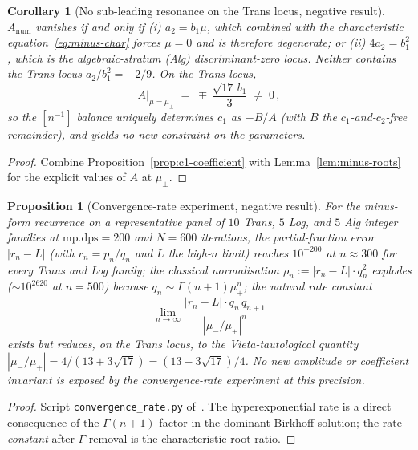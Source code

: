 \documentclass[11pt]{amsart}
\newtheorem{proposition}[theorem]{Proposition}
\newtheorem{corollary}[theorem]{Corollary}
\theoremstyle{definition}
\theoremstyle{remark}
\begin{document}
\begin{corollary}[No sub-leading resonance on the Trans locus,
negative result]
\label{cor:no-resonance}
$A_{\text{num}}$ vanishes if and only if (i) $a_2 = b_1\mu$, which
combined with the characteristic equation~\eqref{eq:minus-char}
forces $\mu = 0$ and is therefore degenerate; or (ii)
$4 a_2 = b_1^2$, which is the algebraic-stratum (Alg)
discriminant-zero locus.  Neither contains the Trans locus
$a_2/b_1^2 = -2/9$.  On the Trans locus,
\[
  A\bigl|_{\mu = \mu_\pm}
  \;=\; \mp\,\frac{\sqrt{17}\,b_1}{3}
  \;\neq\;0\,,
\]
so the $[n^{-1}]$ balance uniquely determines $c_1$ as $-B/A$
(with $B$ the $c_1$-and-$c_2$-free remainder), and yields no new
constraint on the parameters.
\end{corollary}
\begin{proof}
Combine Proposition~\ref{prop:c1-coefficient} with
Lemma~\ref{lem:minus-roots} for the explicit values of $A$ at
$\mu_\pm$.
\end{proof}

\begin{proposition}[Convergence-rate experiment, negative result]
\label{prop:rate}
For the minus-form recurrence on a representative panel of $10$
Trans, $5$ Log, and $5$ Alg integer families at $\mathrm{mp.dps}=200$
and $N=600$ iterations, the partial-fraction error
$|r_n - L|$ (with $r_n = p_n/q_n$ and $L$ the high-$n$ limit) reaches
$10^{-200}$ at $n\approx 300$ for every Trans and Log family;
the classical normalisation $\rho_n := |r_n-L|\cdot q_n^2$ explodes
($\sim\!10^{2620}$ at $n=500$) because $q_n \sim \Gamma(n+1)\mu_+^n$;
the natural rate constant
\[
  \lim_{n\to\infty}\frac{|r_n - L|\cdot q_n\,q_{n+1}}{|\mu_-/\mu_+|^n}
\]
exists but reduces, on the Trans locus, to the
Vieta-tautological quantity
$|\mu_-/\mu_+| = 4/(13+3\sqrt{17}) = (13-3\sqrt{17})/4$.  No new
amplitude or coefficient invariant is exposed by the convergence-rate
experiment at this precision.
\end{proposition}
\begin{proof}
Script \texttt{convergence\_rate.py} of~\cite{SprintW3Report}.
The hyperexponential rate is a direct consequence of the
$\Gamma(n+1)$ factor in the dominant Birkhoff solution; the rate
\emph{constant} after $\Gamma$-removal is the characteristic-root ratio.
\end{proof}
\end{document}
